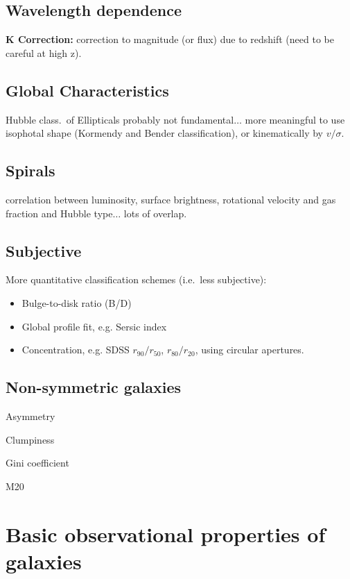 \documentclass[12pt]{article}
\begin{document}
\subsection{Wavelength dependence}
\textbf{K Correction:} correction to magnitude (or flux) due
to redshift (need to be careful at high z).

\subsection*{Global Characteristics}
Hubble class.\ of Ellipticals probably not fundamental$\ldots$
more meaningful to use isophotal shape (Kormendy and Bender
classification), or kinematically by $v/\sigma$.

\subsection*{Spirals}
correlation between luminosity, surface brightness,
rotational velocity and gas fraction and Hubble type$\ldots$ lots of
overlap.

\subsection*{Subjective}
More quantitative classification schemes (i.e.\ less subjective):
    \begin{itemize}
      \item Bulge-to-disk ratio (B/D)
      \item Global profile fit, e.g. Sersic index
      \item Concentration, e.g. SDSS $r_{90}/r_{50}$, $r_{80}/r_{20}$,
      using circular apertures.
    \end{itemize}

\subsection*{Non-symmetric galaxies}
    \begin{itemize*}
      \item Asymmetry
      \item Clumpiness
      \item Gini coefficient
      \item M20
    \end{itemize*}

\section*{Basic observational properties of galaxies}
\end{document}
